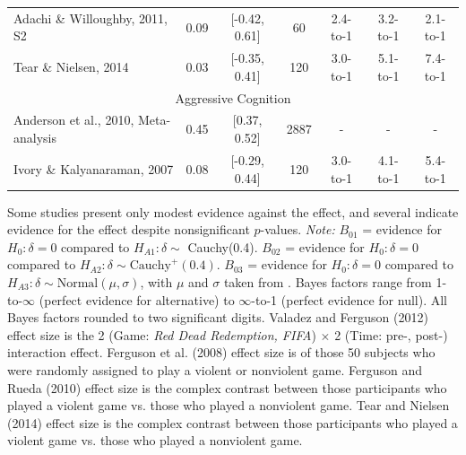 \documentclass[man]{apa6}
\begin{document}
\begin{table}
\begin{tabular}{lcccccc}
\hspace{.2in} Adachi \& Willoughby, 2011, S2&0.09&[-0.42, 0.61]&60&2.4-to-1&3.2-to-1&2.1-to-1 \\
\hspace{.2in} Tear \& Nielsen, 2014 &0.03&[-0.35, 0.41]&120&3.0-to-1&5.1-to-1&7.4-to-1 \\
\multicolumn{7}{c}{Aggressive Cognition}\\
Anderson et al., 2010, Meta-analysis&0.45&[0.37, 0.52]&2887&-&-&- \\
\hspace{.2in} Ivory \& Kalyanaraman, 2007&0.08&[-0.29, 0.44]&120&3.0-to-1&4.1-to-1&5.4-to-1 \\ \hline
\end{tabular}

\vspace{4mm}
Some studies present only modest evidence against the effect, and several indicate evidence for the effect despite nonsignificant $p$-values. 
{\em Note:} $B_{01}$ = evidence for $H_0: \delta = 0$ compared to $H_{A1}: \delta \sim$ Cauchy(0.4). $B_{02}$ = evidence for $H_0: \delta = 0$ compared to $H_{A2}: \delta \sim \mbox{Cauchy}^{+}(0.4)$. $B_{03}$ = evidence for $H_0: \delta = 0$ compared to $H_{A3}: \delta \sim \mbox{Normal}(\mu, \sigma)$, with $\mu$ and $\sigma$ taken from \citet{Anderson:etal:2010}. Bayes factors range from 1-to-$\infty$ (perfect evidence for alternative) to $\infty$-to-1 (perfect evidence for null). All Bayes factors rounded to two significant digits. Valadez and Ferguson (2012) effect size is the 2 (Game: {\em Red Dead Redemption, FIFA}) $\times$ 2 (Time: pre-, post-) interaction effect. Ferguson et al. (2008) effect size is of those 50 subjects who were randomly assigned to play a violent or nonviolent game. Ferguson and Rueda (2010) effect size is the complex contrast between those participants who played a violent game vs. those who played a nonviolent game. Tear and Nielsen (2014) effect size is the complex contrast between those participants who played a violent game vs. those who played a nonviolent game.
\label{mainStudyResults}
\end{table}
\end{document}
